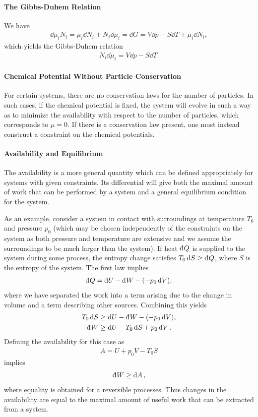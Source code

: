 \paragraph{The Gibbs-Duhem Relation}
We have
\begin{align*}
	\dd{\mu_{i}N_{i}} = \mu_{i}\dd{N_{i}} + N_{i}\dd{\mu_{i}} = \dd{G} = V\dd{p} - S\dd{T} + \mu_{i}\dd{N_{i}},
\end{align*}
which yields the Gibbs-Duhem relation
\begin{align*}
	N_{i}\dd{\mu_{i}} = V\dd{p} - S\dd{T}.
\end{align*}

\paragraph{Chemical Potential Without Particle Conservation}
For certain systems, there are no conservation laws for the number of particles. In such cases, if the chemical potential is fixed, the system will evolve in such a way as to minimize the availability with respect to the number of particles, which corresponds to $\mu = 0$. If there is a conservation law present, one must instead construct a constraint on the chemical potentials.

\paragraph{Availability and Equilibrium}
The availability is a more general quantity which can be defined appropriately for systems with given constraints. Its differential will give both the maximal amount of work that can be performed by a system and a general equilibrium condition for the system.

As an example, consider a system in contact with surroundings at temperature $T_{0}$ and pressure $p_{0}$ (which may be chosen independently of the constraints on the system as both pressure and temperature are extensive and we assume the surroundings to be much larger than the system). If heat $\din{Q}$ is supplied to the system during some process, the entropy change satisfies $T_{0}\dd{S} \geq \din{Q}$, where $S$ is the entropy of the system. The first law implies
\begin{align*}
	\din{Q} = \dd{U} - \din{W} - (-p_{0}\dd{V}),
\end{align*}
where we have separated the work into a term arising due to the change in volume and a term describing other sources. Combining this yields
\begin{align*}
	T_{0}\dd{S} &\geq \dd{U} - \din{W} - (-p_{0}\dd{V}), \\
	\din{W}     &\geq \dd{U} - T_{0}\dd{S}  + p_{0}\dd{V}.
\end{align*}
Defining the availability for this case as
\begin{align*}
	A = U + p_{0}V - T_{0}S
\end{align*}
implies
\begin{align*}
	\din{W} \geq \dd{A},
\end{align*}
where equality is obtained for a reversible processes. Thus changes in the availability are equal to the maximal amount of useful work that can be extracted from a system.

